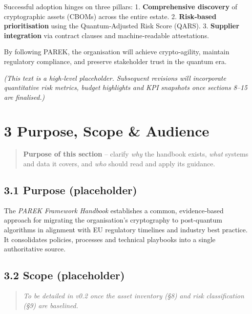 \documentclass[
  english,
]{article}
\begin{document}
Successful adoption hinges on three pillars: 1. \textbf{Comprehensive
discovery} of cryptographic assets (CBOMs) across the entire estate. 2.
\textbf{Risk‑based prioritisation} using the Quantum‑Adjusted Risk Score
(QARS). 3. \textbf{Supplier integration} via contract clauses and
machine‑readable attestations.

By following PAREK, the organisation will achieve crypto‑agility,
maintain regulatory compliance, and preserve stakeholder trust in the
quantum era.

\emph{(This text is a high‑level placeholder. Subsequent revisions will
incorporate quantitative risk metrics, budget highlights and KPI
snapshots once sections 8--15 are finalised.)}

\section{3 Purpose, Scope \& Audience}\label{purpose-scope-audience}

\begin{quote}
\textbf{Purpose of this section} -- clarify \emph{why} the handbook
exists, \emph{what} systems and data it covers, and \emph{who} should
read and apply its guidance.
\end{quote}

\subsection{3.1 Purpose (placeholder)}\label{purpose-placeholder}

The \emph{PAREK Framework Handbook} establishes a common, evidence‑based
approach for migrating the organisation's cryptography to post‑quantum
algorithms in alignment with EU regulatory timelines and industry best
practice. It consolidates policies, processes and technical playbooks
into a single authoritative source.

\subsection{3.2 Scope (placeholder)}\label{scope-placeholder}

\begin{quote}
\emph{To be detailed in v0.2 once the asset inventory (§8) and risk
classification (§9) are baselined.}
\end{quote}
\end{document}
